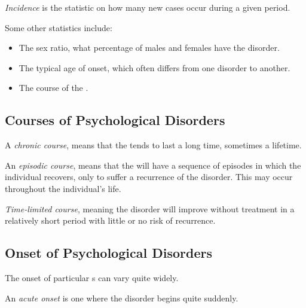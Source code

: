 \begin{definition}[Incidence]\label{def:Incidence}
  \emph{Incidence} is the statistic on how many new cases occur during a given period.
\end{definition}

Some other statistics include:
\begin{itemize}[noitemsep]
\item The sex ratio, what percentage of males and females have the disorder.
\item The typical age of onset, which often differs from one disorder to another.
\item The course of the .
\end{itemize}

\subsection{Courses of Psychological Disorders}
\begin{definition}\label{def:Chronic_Course}
  A \emph{chronic course}, means that the  tends to last a long time, sometimes a lifetime.
\end{definition}

\begin{definition}
  An \emph{episodic course}, means that the  will have a sequence of episodes in which the individual recovers, only to suffer a recurrence of the disorder.
  This may occur throughout the individual's life.
\end{definition}

\begin{definition}\label{def:Time_Limited_Course}
  \emph{Time-limited course}, meaning the disorder will improve without treatment in a relatively short period with little or no risk of recurrence.
\end{definition}

\subsection{Onset of Psychological Disorders}
The onset of particular s can vary quite widely.

\begin{definition}\label{def:Acute_Onset}
  An \emph{acute onset}  is one where the disorder begins quite suddenly.
\end{definition}

